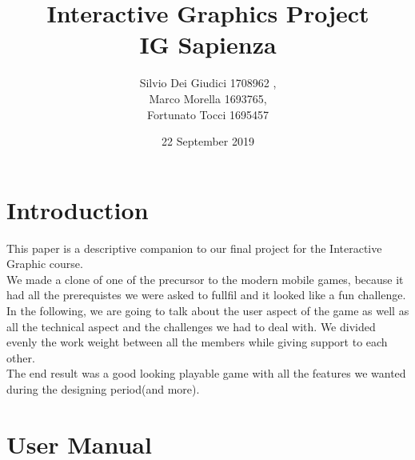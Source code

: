 \documentclass[a4paper, 11pt]{article}
\title { Interactive Graphics Project\\ \bigskip \large IG Sapienza}
\date{22 September 2019}
\author{Silvio Dei Giudici 1708962 , \\Marco Morella 1693765, \\Fortunato Tocci 1695457}
\begin{document}
\maketitle

\tableofcontents

\section{Introduction}
This paper is a descriptive companion to our final project for the Interactive Graphic course.\\
We made a clone of one of the precursor to the modern mobile games, because it had all the prerequistes we were asked to fullfil and it looked like a fun challenge. In the following, we are going to talk about the user aspect of the game as well as all the technical aspect and the challenges we had to deal with. We divided evenly the work weight between all the members while giving support to each other.\\
The end result was a good looking playable game with all the features we wanted during the designing period(and more).
\newpage

\section{User Manual}
\end{document}
